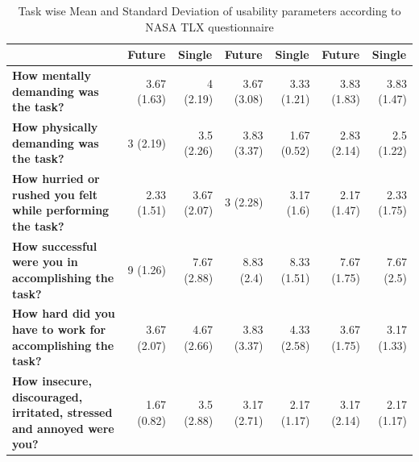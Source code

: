 \documentclass[english]{tktltiki}
\begin{document}
\begin{table}[h!]
\begin{center}
{\begin{tabular}{|p{6cm}|r|r|r|r|r|r|}
        \multicolumn{1}{|c|}{} & \multicolumn{1}{|c|}{\textbf{Future}} & \multicolumn{1}{|c|}{\textbf{Single}} & \multicolumn{1}{|c|}{\textbf{Future}} & \multicolumn{1}{|c|}{\textbf{Single}} & \multicolumn{1}{|c|}{\textbf{Future}} & \multicolumn{1}{|c|}{\textbf{Single}} \\
        \hline
        
        \textbf{How mentally demanding was the task?} & 3.67 (1.63) & 4 (2.19) & 3.67 (3.08) & 3.33 (1.21) & 3.83 (1.83) & 3.83  (1.47)\\
        \hline
        
        \textbf{How physically demanding was the task?} & 3 (2.19) & 3.5 (2.26) & 3.83 (3.37) & 1.67 (0.52) & 2.83 (2.14) & 2.5 (1.22) \\
        \hline
        
        \textbf{How hurried or rushed you felt while performing the task?} & 2.33 (1.51) & 3.67 (2.07) & 3 (2.28) & 3.17 (1.6) & 2.17 (1.47) & 2.33 (1.75) \\
        \hline
        
        \textbf{How successful were you in accomplishing the task?} & 9 (1.26) & 7.67 (2.88) & 8.83 (2.4) & 8.33 (1.51) & 7.67 (1.75) & 7.67 (2.5) \\
        \hline
        
        \textbf{How hard did you have to work for accomplishing the task?} & 3.67 (2.07) & 4.67 (2.66) & 3.83 (3.37) & 4.33 (2.58) & 3.67 (1.75) & 3.17 (1.33) \\
        \hline
        
        \textbf{How insecure, discouraged, irritated, stressed and annoyed were you?} & 1.67 (0.82) & 3.5 (2.88) & 3.17 (2.71) & 2.17 (1.17) & 3.17 (2.14) & 2.17 (1.17) \\
        \hline
        
    \end{tabular}
    }
	\end{center}
	\caption{Task wise Mean and Standard Deviation of usability parameters according to NASA TLX questionnaire}
    \label{table:use_mean_std_task}
\end{table}



\iffalse
\end{document}
